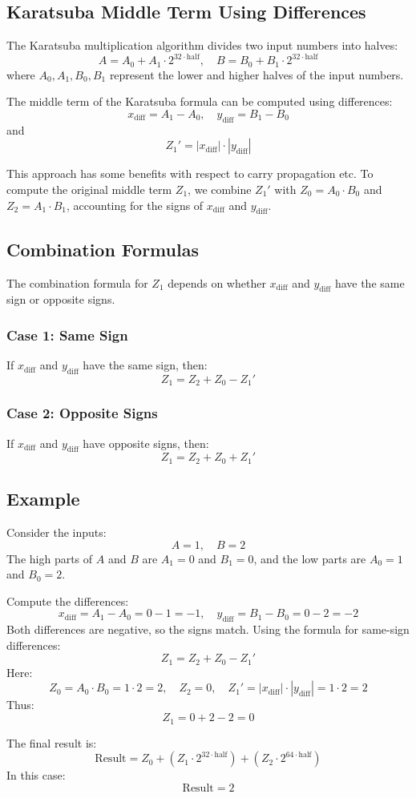 \documentclass[12pt]{article}
\begin{document}
\subsection*{Karatsuba Middle Term Using Differences}
The Karatsuba multiplication algorithm divides two input numbers into halves:
\[
A = A_0 + A_1 \cdot 2^{32 \cdot \text{half}}, \quad B = B_0 + B_1 \cdot 2^{32 \cdot \text{half}}
\]
where \( A_0, A_1, B_0, B_1 \) represent the lower and higher halves of the input numbers.

The middle term of the Karatsuba formula can be computed using differences:
\[
x_{\text{diff}} = A_1 - A_0, \quad y_{\text{diff}} = B_1 - B_0
\]
and
\[
Z_1' = |x_{\text{diff}}| \cdot |y_{\text{diff}}|
\]

This approach has some benefits with respect to carry propagation etc.  To compute the original middle term \( Z_1 \), we combine \( Z_1' \) with \( Z_0 = A_0 \cdot B_0 \) and \( Z_2 = A_1 \cdot B_1 \), accounting for the signs of \( x_{\text{diff}} \) and \( y_{\text{diff}} \).

\subsection*{Combination Formulas}
The combination formula for \( Z_1 \) depends on whether \( x_{\text{diff}} \) and \( y_{\text{diff}} \) have the same sign or opposite signs.

\subsubsection*{Case 1: Same Sign}
If \( x_{\text{diff}} \) and \( y_{\text{diff}} \) have the same sign, then:
\[
Z_1 = Z_2 + Z_0 - Z_1'
\]

\subsubsection*{Case 2: Opposite Signs}
If \( x_{\text{diff}} \) and \( y_{\text{diff}} \) have opposite signs, then:
\[
Z_1 = Z_2 + Z_0 + Z_1'
\]

\subsection*{Example}
Consider the inputs:
\[
A = 1, \quad B = 2
\]
The high parts of \( A \) and \( B \) are \( A_1 = 0 \) and \( B_1 = 0 \), and the low parts are \( A_0 = 1 \) and \( B_0 = 2 \).

Compute the differences:
\[
x_{\text{diff}} = A_1 - A_0 = 0 - 1 = -1, \quad y_{\text{diff}} = B_1 - B_0 = 0 - 2 = -2
\]
Both differences are negative, so the signs match. Using the formula for same-sign differences:
\[
Z_1 = Z_2 + Z_0 - Z_1'
\]
Here:
\[
Z_0 = A_0 \cdot B_0 = 1 \cdot 2 = 2, \quad Z_2 = 0, \quad Z_1' = |x_{\text{diff}}| \cdot |y_{\text{diff}}| = 1 \cdot 2 = 2
\]
Thus:
\[
Z_1 = 0 + 2 - 2 = 0
\]

The final result is:
\[
\text{Result} = Z_0 + (Z_1 \cdot 2^{32 \cdot \text{half}}) + (Z_2 \cdot 2^{64 \cdot \text{half}})
\]
In this case:
\[
\text{Result} = 2
\]
\end{document}
